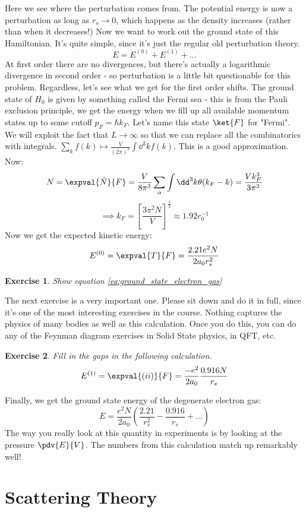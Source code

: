 \documentclass{article}
\newtheorem{exercise}{Exercise}[section]
\begin{document}
Here we see where the perturbation comes from. The potential energy is now a perturbation as long as $r_s \to 0$, which happens as the density increases (rather than when it decreases!) Now we want to work out the ground state of this Hamiltonian. It's quite simple, since it's just the regular old perturbation theory.
\[E = E^{(0)} + E^{(1)} + ...\]
At first order there are no divergences, but there's actually a logarithmic divergence in second order - so perturbation is a little bit questionable for this problem. Regardless, let's see what we get for the first order shifts. The ground state of $H_0$ is given by something called the Fermi sea - this is from the Pauli exclusion principle, we get the energy when we fill up all available momentum states up to some cutoff $p_F = \hbar k_F$. Let's name this state $\ket{F}$ for "Fermi". We will exploit the fact that $L\to \infty$ so that we can replace all the combinatorics with integrals. $\sum_k f(k) \mapsto \frac{V}{(2\pi)^3}\int \dd^3 k f(k)$. This is a good approximation. Now:
\[N = \expval{\hat N}{F} = \frac{V}{8\pi^3}\sum_\alpha \int \dd^3 k \theta(k_F - k) = \frac{V k_F^3}{3\pi^2}\]
\[\implies k_{F} = \left[\frac{3\pi^2 N}{V}\right]^{\frac{1}{3}} \approx 1.92 r_0^{-1}\]
Now we get the expected kinetic energy:
\begin{equation}E^{(0)} = \expval{T}{F} = \frac{2.21 e^2 N}{2a_0 r_s^2} \label{eq:ground_state_electron_gas}\end{equation}
\begin{exercise} Show equation \eqref{eq:ground_state_electron_gas}\end{exercise}
The next exercise is a very important one. Please sit down and do it in full, since it's one of the most interesting exercises in the course. Nothing captures the physics of many bodies as well as this calculation. Once you do this, you can do any of the Feynman diagram exercises in Solid State physics, in QFT, etc.
\begin{exercise}Fill in the gaps in the following calculation.
\[E^{(1)} = \expval{(ii)}{F} = \frac{-e^2}{2a_0}\frac{0.916 N}{r_s}\]\end{exercise}
Finally, we get the ground state energy of the degenerate electron gas:
\[E = \frac{e^2 N}{2a_0}\left(\frac{2.21}{r_s^2}-\frac{0.916}{r_s}+...\right)\]
The way you really look at this quantity in experiments is by looking at the pressure $\pdv{E}{V}$. The numbers from this calculation match up remarkably well!

\pagebreak

\section{Scattering Theory}
\end{document}
